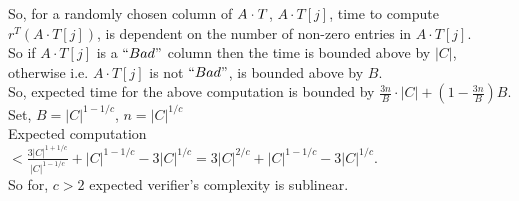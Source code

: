 So, for a randomly chosen column of $A\cdot T$, $A\cdot T[j]$, time to compute $r^T(A\cdot T[j])$, is dependent on the number of non-zero entries in $A\cdot T[j]$.\\
So if $A\cdot T[j]$ is a $``Bad"$ column then the time is bounded above by $|C|$, otherwise i.e. $A\cdot T[j]$ is not $``Bad"$, is bounded above by $B$.\\
So, expected time for the above computation is bounded by $\frac{3n}{B}\cdot |C|+ (1-\frac{3n}{B})B$.
Set, $B=|C|^{1-1/c}$, $n=|C|^{1/c}$\\
Expected computation $< \frac{3|C|^{1+1/c}}{|C|^{1-1/c}} + |C|^{1-1/c} - 3|C|^{1/c} = 3|C|^{2/c} + |C|^{1-1/c} - 3|C|^{1/c}$.\\
So for, $c > 2$ expected verifier's complexity is sublinear. 
 
